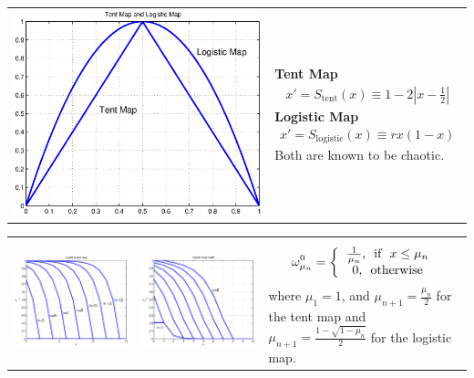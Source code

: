\documentclass[landscape,a0b,final]{a0poster}
\newenvironment{poster}{
  \begin{center}
  \begin{minipage}[c]{0.98\textwidth}
}{
  \end{minipage} 
  \end{center}
}
\newenvironment{pcolumn}[1]{
  \begin{minipage}{#1\textwidth}
  \begin{center}
}{
  \end{center}
  \end{minipage}
}
\begin{document}
\begin{poster}
\begin{center}
\begin{pcolumn}{0.32}
{\begin{tabular}{c|l}
  \includegraphics[width=0.35\hsize]{tentmapandlogisticmap.eps}&
  \begin{minipage}[b]{0.6\hsize}
    \textbf{Tent Map}  
     \begin{eqnarray}
        \label{tentmap}
          x' = S_\text{tent}(x) \equiv 1-2|x-\frac{1}{2}|
     \end{eqnarray}
    \textbf{Logistic Map}
     \begin{eqnarray}
        \label{logisticmap}
          x' = S_\text{logistic}(x) \equiv rx(1-x)
     \end{eqnarray}
    Both are known to be chaotic. 
  \end{minipage}
\end{tabular}

\begin{tabular}{cc|l}
\includegraphics[width=0.3\hsize ,trim=1.2cm 0.8cm 1.2cm 0.8cm,clip]{tentmapcutoff} &
\includegraphics[width=0.3\hsize ,trim=1.2cm 0.8cm 1.2cm 0.8cm,clip]{logisticmapcutoff}&
\begin{minipage}[b]{0.38\hsize}
    \begin{eqnarray}
    \label{tentmapinitial}
    \omega_{\mu_n}^0 = \left\{ \begin{tabular}{c}
                      $\frac{1}{\mu_n}$, \mbox{  if  } $x \le \mu_n$\\ 
                      $0$, \mbox{  otherwise} 
                      \end{tabular}\right.
     \end{eqnarray}
    where $\mu_1 = 1$, and $\mu_{n+1} = \frac{\mu_n}{2}$ for the tent map and $\mu_{n+1}=\frac{1-\sqrt{1-\mu_n}}{2}$ for the logistic map.
\end{minipage} 
\end{tabular}

}
\end{pcolumn}
\end{center}
\end{poster}
\end{document}
